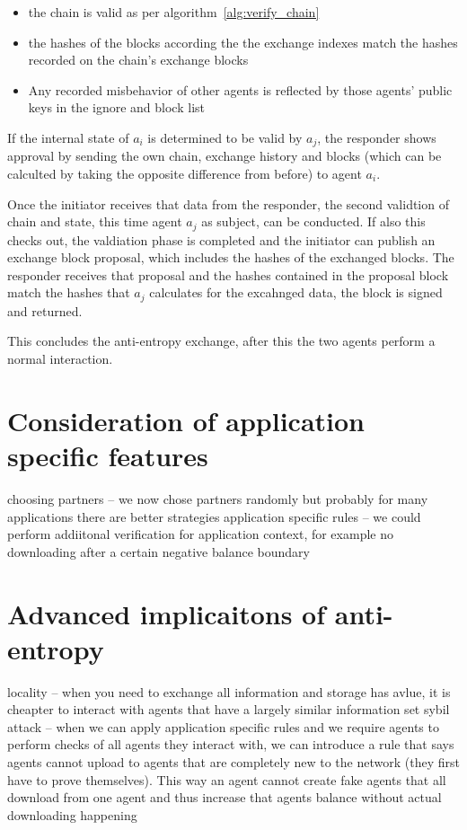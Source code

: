 \begin{itemize}
    \item the chain is valid as per algorithm~\ref{alg:verify_chain}
    \item the hashes of the blocks according the the exchange indexes match the hashes recorded on
    the chain's exchange blocks
    \item Any recorded misbehavior of other agents is reflected by those agents' public keys in the 
    ignore and block list
\end{itemize}

If the internal state of $a_i$ is determined to be valid by $a_j$, the responder shows approval by 
sending the own chain, exchange history and blocks (which can be calculted by taking the opposite
difference from before) to agent $a_i$. 

Once the initiator receives that data from the responder, the second validtion of chain and state, 
this time agent $a_j$ as subject, can be conducted. If also this checks out, the valdiation phase is 
completed and the initiator can publish an exchange block proposal, which includes the hashes of the
exchanged blocks. The responder receives that proposal and the hashes contained in the proposal block
match the hashes that $a_j$ calculates for the excahnged data, the block is signed and returned.

This concludes the anti-entropy exchange, after this the two agents perform a normal interaction.

\section{Consideration of application specific features}
choosing partners -- we now chose partners randomly but probably for many applications there are 
better strategies
application specific rules -- we could perform addiitonal verification for application context, for
example no downloading after a certain negative balance boundary

\section{Advanced implicaitons of anti-entropy}
locality -- when you need to exchange all information and storage has avlue, it is cheapter to 
interact with agents that have a largely similar information set
sybil attack -- when we can apply application specific rules and we require agents to perform checks
of all agents they interact with, we can introduce a rule that says agents cannot upload to agents
that are completely new to the network (they first have to prove themselves). This way an agent 
cannot create fake agents that all download from one agent and thus increase that agents balance 
without actual downloading happening
